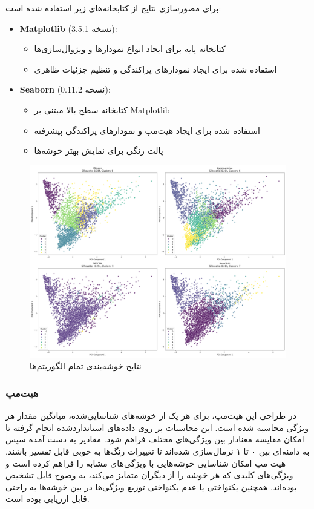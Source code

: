 \documentclass[a4paper,12pt]{article}
\begin{document}
برای مصورسازی نتایج از کتابخانه‌های زیر استفاده شده است:
\begin{itemize}
\item \textbf{Matplotlib} (نسخه 3.5.1):
\begin{itemize}
\item کتابخانه پایه برای ایجاد انواع نمودارها و ویژوال‌سازی‌ها
\item استفاده شده برای ایجاد نمودارهای پراکندگی و تنظیم جزئیات ظاهری
\end{itemize}

\item \textbf{Seaborn} (نسخه 0.11.2):
\begin{itemize}
\item کتابخانه سطح بالا مبتنی بر Matplotlib
\item استفاده شده برای ایجاد هیت‌مپ و نمودارهای پراکندگی پیشرفته
\item پالت رنگی  برای نمایش بهتر خوشه‌ها
\end{itemize}
\end{itemize}


\begin{figure}[h]
\centering
\includegraphics[width=\textwidth]{all_clustering_results.png}
\caption{نتایج خوشه‌بندی تمام الگوریتم‌ها}
\label{fig:clustering_results}
\end{figure}
	
\subsubsection*{\textbf{هیت‌مپ }}
در طراحی این هیت‌مپ، برای هر یک از خوشه‌های شناسایی‌شده، میانگین مقدار هر ویژگی محاسبه شده است. این محاسبات بر روی داده‌های استانداردشده انجام گرفته تا امکان مقایسه معنادار بین ویژگی‌های مختلف فراهم شود. مقادیر به دست آمده سپس به دامنه‌ای بین ۰ تا ۱ نرمال‌سازی شده‌اند تا تغییرات رنگ‌ها به خوبی قابل تفسیر باشند.
هیت مپ امکان شناسایی خوشه‌هایی با ویژگی‌های مشابه را فراهم کرده است و ویژگی‌های کلیدی که هر خوشه را از دیگران متمایز می‌کند، به وضوح قابل تشخیص بوده‌اند. همچنین یکنواختی یا عدم یکنواختی توزیع ویژگی‌ها در بین خوشه‌ها به راحتی قابل ارزیابی بوده است.
\end{document}
